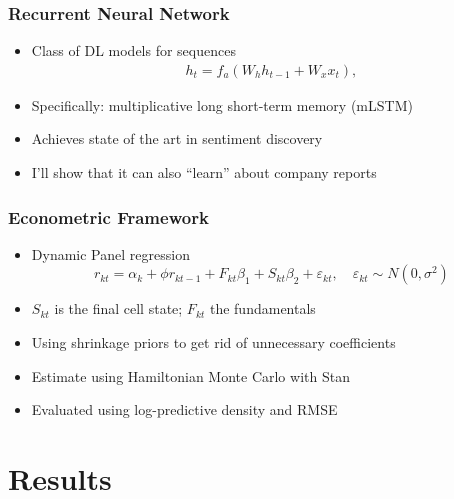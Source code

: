 \documentclass{article}
\begin{document}
\begin{frame}
  \frametitle{Recurrent Neural Network}
  \begin{itemize}
  \item Class of DL models for sequences\\
    \begin{align}
     h_t = f_a(W_{h} h_{t-1} + W_{x} x_t),
    \end{align}
    
  \item Specifically: multiplicative long short-term memory (mLSTM)
  \item Achieves state of the art in sentiment discovery \citep{sentiment_neuron}
  \item I'll show that it can also ``learn'' about company reports
  \end{itemize}
\end{frame}
\begin{frame}
  \frametitle{Econometric Framework}
  \begin{itemize}
  \item Dynamic Panel regression \\
    \begin{equation}
      r_{kt}= \alpha_k + \phi r_{k t-1}+  F_{kt}  \beta_1 + S_{kt}   \beta_2 + \varepsilon_{kt},\quad \varepsilon_{kt} \sim N(0, \sigma^2) \label{eq: panelreg}
  \end{equation}
  
\item $S_{kt}$ is the final cell state; $F_{kt}$ the fundamentals

\item Using shrinkage priors \citep{aki2017sparsity} to get rid of unnecessary coefficients
\item Estimate using Hamiltonian Monte Carlo with Stan
\item Evaluated using log-predictive density and RMSE \citep{geweke2010comparing} 

  \end{itemize}
\end{frame}


\section{Results}
\frame{\sectionpage}
  
\end{document}
